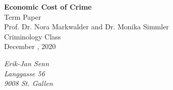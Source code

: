 \documentclass[a4paper,12pt]{article}
\begin{document}



\begin{titlepage}       %

\thispagestyle{empty}   %


\begin{center}
\vspace*{2.5cm}
{\bf  \Large   Economic Cost of Crime }\\
\vspace*{3cm} 
Term Paper\\
Prof. Dr. Nora Markwalder and Dr. Monika Simmler
\\ Criminology Class\\

\vspace*{0.5cm} 
December , 2020\\
\end{center}

\vfill
\begin{flushright}
   \emph{Erik-Jan Senn} \\
    \emph{Langgasse 56}\\
    \emph{9008 St. Gallen}\\

\end{flushright}



% 
% 
% 

\end{titlepage}

\newpage                %





\newpage
\tableofcontents   %

\listoftables 

\listoffigures
% 
\newpage
% 
\end{document}
